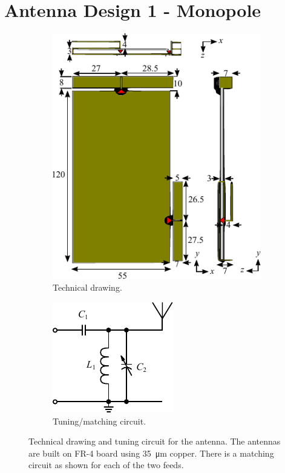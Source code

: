 \section{Antenna Design 1 - Monopole}

\begin{figure}[htbp]
    \begin{subfigure}[b]{0.49\linewidth}
        \centering
        \includegraphics{img/tech_sol/monopole/tech_drawing}
        \caption{Technical drawing.}
        \label{fig:ant1technical}
    \end{subfigure}
    \hfill
    \begin{subfigure}[b]{0.49\linewidth}
        \centering
        \includegraphics{img/tech_sol/schematic_tuning_1}
        \caption{Tuning/matching circuit.}
        \label{fig:ant1schematic}
    \end{subfigure}
    \caption{Technical drawing and tuning circuit for the antenna.  The antennas are built on FR-4 board using \SI{35}{\micro\meter} copper. There is a matching circuit as shown for each of the two feeds.}
    \label{fig:ant2techschem}
\end{figure}

